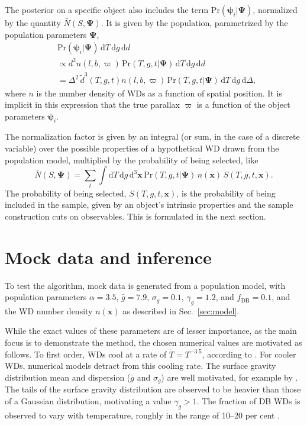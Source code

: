 \documentclass[fleqn,usenatbib]{mnras}
\newcommand{\popp}{\boldsymbol{\Psi}}
\newcommand{\objp}{\boldsymbol{\psi}}
\newcommand{\Teff}{T}
\newcommand{\logg}{g}
\newcommand{\pr}{\text{Pr}}
\newcommand{\de}{\text{d}}
\begin{document}
The posterior on a specific object also includes the term $\pr(\objp_i | \popp)$, normalized by the quantity $\bar{N}(S,\popp)$. It is given by the population, parametrized by the population parameters $\popp$,
\begin{equation}
\begin{split}
	& \pr(\objp_i | \popp)\, \de \Teff\, \de \logg\, \de d  \\ & \propto
    d^2 n(l,b,\varpi)\, \pr(\Teff,g,t | \popp)\, \de \Teff\, \de \logg\, \de d \\
    & = \Delta^2\, \tilde{d}^3(\Teff,\logg,t) n(l,b,\varpi)\, \pr(\Teff,g,t | \popp)\, \de \Teff\, \de\logg\, \de \Delta,
\end{split}
\end{equation}
where $n$ is the number density of WDs as a function of spatial position. It is implicit in this expression that the true parallax $\varpi$ is a function of the object parameters $\objp_i$.

The normalization factor is given by an integral (or sum, in the case of a discrete variable) over the possible properties of a hypothetical WD drawn from the population model, multiplied by the probability of being selected, like
\begin{equation}\label{eq:normalization}
	\bar{N}(S,\popp) = \sum_{t} \int \de\Teff\, \de \logg\, \de^3\mathbf{x}\,
    \pr(\Teff,g,t | \popp)\, n(\mathbf{x})\, S(\Teff,\logg,t,\mathbf{x}).
\end{equation}
The probability of being selected, $S(\Teff,\logg,t,\mathbf{x})$, is the probability of being included in the sample, given by an object's intrinsic properties and the sample construction cuts on observables. This is formulated in  the next section.







\section{Mock data and inference}\label{sec:mock}

To test the algorithm, mock data is generated from a population model, with population parameters $\alpha=3.5$, $\bar{g}=7.9$, $\sigma_g=0.1$, $\gamma_g=1.2$, and $f_\text{DB}=0.1$, and the WD number density $n(\mathbf{x})$ as described in Sec.~\ref{sec:model}.

While the exact values of these parameters are of lesser importance, as the main focus is to demonstrate the method, the chosen numerical values are motivated as follows. To first order, WDs cool at a rate of $\dot{\Teff} = \Teff^{-3.5}$, according to \cite{1952MNRAS.112..583M}. For cooler WDs, numerical models detract from this cooling rate. The surface gravity distribution mean and dispersion ($\bar{g}$ and $\sigma_g$) are well motivated, for example by \cite{2006ApJS..167...40E}. The tails of the surface gravity distribution are observed to be heavier than those of a Gaussian distribution, motivating a value $\gamma_g>1$. The fraction of DB WDs is observed to vary with temperature, roughly in the range of 10--20 per cent \citep{2011ApJ...737...28B}.
\end{document}
